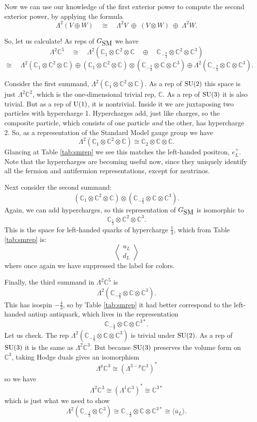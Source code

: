 \documentclass[12pt]{article}
\newcommand{\C}{{\mathbb C}}  %
\newcommand{\U}{{\rm U}}    %
\newcommand{\SU}{{\rm SU}}    %
\newcommand{\Ex}{\Lambda} %
\newcommand{\iso}{\cong} %
\newcommand{\third}{\frac{1}{3}} %
\newcommand{\twothirds}{\frac{2}{3}} %
\newcommand{\fourthirds}{\frac{4}{3}} %
\newcommand{\GSM}{{G_{\mbox{\rm SM}}}}  %
\newcommand{\ubar}{\overline{u}} %
\newcommand{\angquark}{\left\langle \! \begin{array}{c} u_L \\ d_L \end{array} \! \right\rangle} %
\begin{document}
Now we can use our knowledge of the first exterior power to
compute the second exterior power, by applying the formula
\[ \Ex^2 (V \oplus W) \quad \iso \quad 
\Ex^2 V \; \oplus \; (V \otimes W) \; \oplus \; \Ex^2 W. \]

So, let us calculate!   As reps of $\GSM$ we have
\[  
\Ex^2 \C^5   \quad \iso \quad
\Ex^2 ( \C_1 \otimes \C^2 \otimes \C \quad 
\oplus \quad \C_{-\twothirds} \otimes \C^2 \otimes \C^3 )  
\]
\[
 \iso  \quad
\Ex^2 ( \C_1 \otimes \C^2 \otimes \C )  \oplus 
      (\C_1 \otimes \C^2 \otimes \C) \otimes 
(\C_{-\twothirds} \otimes \C \otimes \C^3)  \oplus 
     \Ex^2 ( \C_{-\twothirds} \otimes \C \otimes \C^3 ).
\]

Consider the first summand, $\Ex^2 ( \C_1 \otimes
\C^2 \otimes \C)$.  As a rep of $\SU(2)$ this space is just $\Ex^2 \C^2$, 
which is the one-dimensional trivial rep, $\C$. 
As a rep of $\SU(3)$ it is also trivial.  But as a rep of
$\U(1)$, it is nontrivial.  Inside it we are juxtaposing 
two particles with hypercharge 1. Hypercharges add, just like charges, 
so the composite particle, which consists of one particle \textsl{and} 
the other, has hypercharge 2.  So, as a representation of the Standard
Model gauge group we have
\[ \Ex^2 (\C_1 \otimes \C^2 \otimes \C) \iso \C_2 \otimes \C \otimes \C  .\]
Glancing at Table \ref{tab:smrep} we see this matches the
left-handed positron, $e^+_L$.  Note that the hypercharges are becoming 
useful now, since they uniquely identify all the fermion and antifermion 
representations, except for neutrinos.

Next consider the second summand:
\[  (\C_1 \otimes \C^2 \otimes \C) \otimes
(\C_{-\twothirds} \otimes \C \otimes \C^3) . \]
Again, we can add hypercharges, so this representation of $\GSM$ is 
isomorphic to
\[ \C_\third \otimes \C^2 \otimes \C^3. \]
This is the space for left-handed quarks of hypercharge $\third$, which
from Table \ref{tab:smrep} is:
\[ \angquark \]
where once again we have suppressed the label for colors.

Finally, the third summand in $\Ex^2 \C^5$ is 
\[ \Ex^2 ( \C_{-\twothirds} \otimes \C \otimes \C^3 ) .\]
This has isospin $-\fourthirds$, so by Table \ref{tab:smrep}
it had better correspond to the left-handed antiup
antiquark, which lives in the representation
\[ \C_{-\fourthirds} \otimes \C \otimes \C^{3*}. \]
Let us check. 
The rep $\Ex^2 ( \C_{-\twothirds} \otimes \C \otimes \C^3 )$ 
is trivial under $\SU(2)$.  As a rep of $\SU(3)$ it is the same as $\Ex^2 \C^3$.  
But because $\SU(3)$ preserves the volume form on $\C^3$, taking Hodge duals 
gives an isomorphism 
\[ \Ex^p \C^3 \iso (\Ex^{3 - p} \C^3)^* \]
so we have
\[ \Ex^2 \C^3 \iso (\Ex^1 \C^3)^* \iso \C^{3*} \]
which is just what we need to show
\[ \Ex^2 ( \C_{-\twothirds} \otimes \C^3 ) \iso 
 \C_{-\fourthirds} \otimes \C \otimes \C^{3*} \iso 
\langle \ubar_L \rangle .\]
\end{document}
